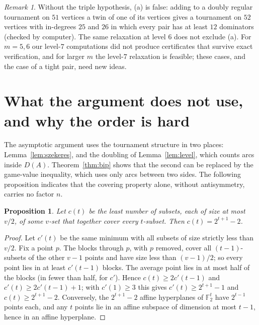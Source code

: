 \documentclass[11pt]{amsart}
\newtheorem{proposition}[theorem]{Proposition}
\theoremstyle{definition}
\theoremstyle{remark}
\newtheorem{remark}[theorem]{Remark}
\newcommand{\D}{D}
\begin{document}
\begin{remark}\label{rem:twin}
Without the triple hypothesis, (a) is false: adding to a doubly regular tournament on $51$ vertices a twin of one of its vertices
gives a tournament on $52$ vertices with in-degrees $25$ and $26$ in which every pair has at least $12$ dominators (checked by
computer). The same relaxation at level $6$ does not exclude (a). For $m=5,6$ our level-$7$ computations did not produce
certificates that survive exact verification, and for larger $m$ the level-$7$ relaxation is feasible; these cases, and the case
of a tight pair, need new ideas.
\end{remark}

\section{What the argument does not use, and why the order is hard}\label{sec:limits}

The asymptotic argument uses the tournament structure in two places: Lemma~\ref{lem:szekeres}, and the doubling of
Lemma~\ref{lem:level}, which counts arcs inside $\D(A)$. Theorem~\ref{thm:bip} shows that the second can be replaced by the
game-value inequality, which uses only arcs between two sides. The following proposition indicates that the covering property alone,
without antisymmetry, carries no factor $n$.

\begin{proposition}\label{prop:cover}
Let $c(t)$ be the least number of subsets, each of size at most $v/2$, of some $v$-set that together cover every $t$-subset. Then
$c(t)=2^{t+1}-2$.
\end{proposition}

\begin{proof}
Let $c'(t)$ be the same minimum with all subsets of size strictly less than $v/2$. Fix a point $p$. The blocks through $p$, with $p$
removed, cover all $(t-1)$-subsets of the other $v-1$ points and have size less than $(v-1)/2$; so every point lies in at least
$c'(t-1)$ blocks. The average point lies in at most half of the blocks (in fewer than half, for $c'$). Hence $c(t)\ge2c'(t-1)$ and
$c'(t)\ge2c'(t-1)+1$; with $c'(1)\ge3$ this gives $c'(t)\ge2^{t+1}-1$ and $c(t)\ge2^{t+1}-2$. Conversely, the $2^{t+1}-2$ affine
hyperplanes of $\mathbb F_2^t$ have $2^{t-1}$ points each, and any $t$ points lie in an affine subspace of dimension at most $t-1$,
hence in an affine hyperplane.
\end{proof}
\end{document}
